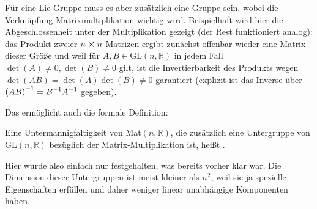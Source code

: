 \documentclass[../H_Analysis_main.tex]{subfiles}
\begin{document}
\begin{bsp}[GL$(n, \mathbb{R})$]
Für eine Lie-Gruppe muss es aber zusätzlich eine Gruppe sein, wobei die Verknüpfung Matrixmultiplikation wichtig wird. Beispielhaft wird hier die Abgeschlossenheit unter der Multiplikation gezeigt (der Rest funktioniert analog): das Produkt zweier $n \cross n$-Matrizen ergibt zunächst offenbar wieder eine Matrix dieser Größe und weil für $A, B \in \text{GL}(n, \mathbb{R})$ in jedem Fall $\det(A) \neq 0, \det(B) \neq 0$ gilt, ist die Invertierbarkeit des Produkts wegen $\det(AB) = \det(A) \det(B) \neq 0$ garantiert (explizit ist das Inverse über $\qty(AB)^{-1} = B^{-1} A^{-1}$ gegeben).
\end{bsp}

Das ermöglicht auch die formale Definition:
\begin{defi}
Eine Untermannigfaltigkeit von Mat$(n, \mathbb{R})$, die zusätzlich eine Untergruppe von GL$(n, \mathbb{R})$ bezüglich der Matrix-Multiplikation ist, heißt .
\end{defi}
Hier wurde also einfach nur festgehalten, was bereits vorher klar war. Die Dimension dieser Untergruppen ist meist kleiner als $n^2$, weil sie ja spezielle Eigenschaften erfüllen und daher weniger linear unabhängige Komponenten haben.

\end{document}
